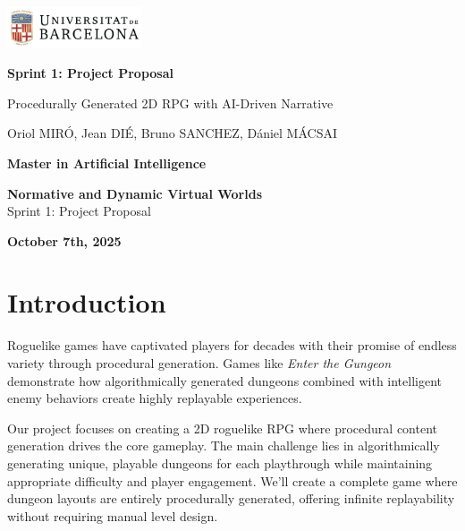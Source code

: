 \documentclass[11pt]{article}
\begin{document}
\begin{titlepage}
    \centering
    \vspace*{1cm}

    \includegraphics[width=0.3\textwidth]{figures/ub_logo.png}

    \vspace{1.5cm}
    {\Huge\bfseries Sprint 1: Project Proposal\par}
    \vspace{1cm}
    {\large Procedurally Generated 2D RPG with AI-Driven Narrative\par}
    \vspace{2cm}
    {\large Oriol MIR\'O, Jean DI\'E, Bruno SANCHEZ, D\'aniel M\'ACSAI\par}
    \vspace{3cm}
    {\large \textbf{Master in Artificial Intelligence}\par}
    \vspace{0.5cm}
    {\large \textbf{Normative and Dynamic Virtual Worlds}\\ Sprint 1: Project Proposal\par}
    \vspace{1cm}
    {\large\bfseries October 7th, 2025\par}
\end{titlepage}

\pagestyle{empty}

\newpage
\tableofcontents
\newpage

\setcounter{page}{1}
\pagestyle{plain}

\section{Introduction}
\label{sec:introduction}

Roguelike games have captivated players for decades with their promise of endless variety through procedural generation. Games like \textit{Enter the Gungeon} demonstrate how algorithmically generated dungeons combined with intelligent enemy behaviors create highly replayable experiences.

Our project focuses on creating a 2D roguelike RPG where procedural content generation drives the core gameplay. The main challenge lies in algorithmically generating unique, playable dungeons for each playthrough while maintaining appropriate difficulty and player engagement. We'll create a complete game where dungeon layouts are entirely procedurally generated, offering infinite replayability without requiring manual level design.
\end{document}
